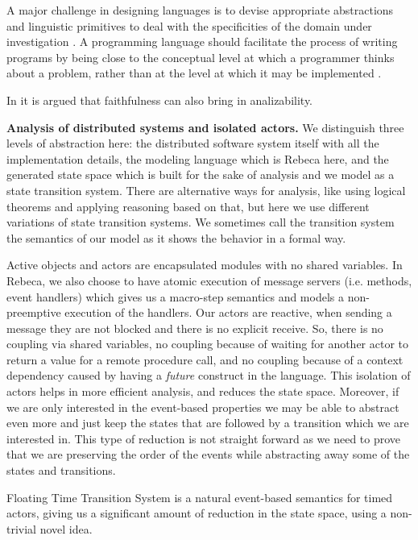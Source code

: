 A major challenge in designing languages is to devise appropriate abstractions and linguistic primitives to deal with the specificities of the domain under investigation \cite{Rocco}.
%
A programming language should facilitate the process of writing programs by being close to the conceptual level at which a programmer thinks about a problem, rather than at the level at which it may be implemented \cite{GulKamrani}. 

In \cite{Friendliness} it is argued that faithfulness can also bring in analizability.

\noindent\textbf{Analysis of distributed systems and isolated actors.}
We distinguish three levels of abstraction here: the distributed software system itself with all the implementation details, the modeling language which is Rebeca here, and the generated state space which is built for the sake of analysis and  we model as a state transition system. There are alternative ways for analysis, like using logical theorems and applying reasoning based on that, but here we use different variations of state transition systems.
We sometimes call the transition system the semantics of our model as it shows the behavior in a formal way.


Active objects and actors are encapsulated modules with no shared variables. In Rebeca, we also choose to have atomic execution of message servers (i.e. methods, event handlers) which gives us a macro-step semantics and models a non-preemptive execution of the handlers.
Our actors are reactive, when sending a message they are not blocked and there is no explicit receive. So, there is no coupling via shared variables, no coupling because of waiting for another actor to return a value for a remote procedure call, and no coupling because of a context dependency caused by having a \textit{future}  construct in the language.
This isolation of actors helps in more efficient analysis, and reduces the state space.
Moreover, if we are only interested in the event-based properties we may be able to abstract even more and just keep the states that are followed by a transition which we are interested in. This type of reduction is not straight forward as we need to prove that we are preserving the order of the events while abstracting away some of the states and transitions. 

Floating Time Transition System is a natural event-based semantics for timed actors, giving us a significant amount of reduction in the state space, using a non-trivial novel idea.
	